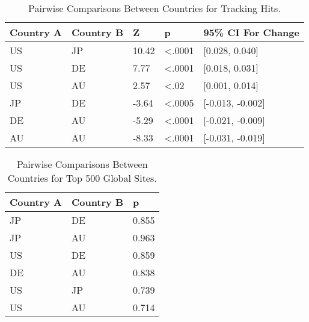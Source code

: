 \documentclass[conference]{IEEEtran}
\begin{document}
\begin{table}[t]
\centering
\caption{Pairwise Comparisons Between Countries for Tracking Hits.}
\label{pairwise}
\begin{tabular}{|l|l|l|l|l|}
   \hline
\textbf{Country A} & \textbf{Country B} & \textbf{Z}     & \textbf{p}              & 9\textbf{5\% CI For Change}   \\    \hline
US        & JP        & 10.42 & \textless.0001 & {[}0.028, 0.040{]}   \\   \hline
US        & DE        & 7.77  & \textless.0001 & {[}0.018, 0.031{]}   \\   \hline
US        & AU        & 2.57  & \textless.02   & {[}0.001, 0.014{]}   \\   \hline
JP        & DE        & -3.64 & \textless.0005 & {[}-0.013, -0.002{]} \\   \hline
DE        & AU        & -5.29 & \textless.0001 & {[}-0.021, -0.009{]} \\   \hline
AU        & AU        & -8.33 & \textless.0001 & {[}-0.031, -0.019{]}\\   \hline
\end{tabular}
\end{table}

\begin{table}[t]
\centering
\caption{Pairwise Comparisons Between Countries for Top 500 Global Sites.}
\label{pairwise500}
\begin{tabular}{|l|l|l|}
\hline
\textbf{Country A} & \textbf{Country B}  & \textbf{p} \\ \hline
JP                            & DE                            & 0.855                         \\ \hline
JP                            & AU                            & 0.963\\ \hline
US                            & DE                            & 0.859                         \\ \hline
DE                            & AU                            & 0.838                         \\ \hline
US                            & JP                            & 0.739                         \\ \hline
US                            & AU                            & 0.714                         \\ \hline        
\end{tabular}
\end{table}
\end{document}
